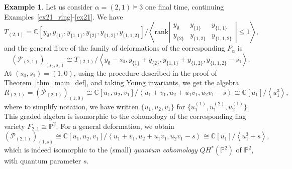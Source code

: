 \documentclass[a4paper,11pt]{amsart}
\theoremstyle{plain}
\theoremstyle{definition}
\newtheorem{example}[theorem]{Example}
\newcommand{\C}{\mathbb{C}}
\newcommand{\CP}{\mathscr{P}}
\renewcommand{\P}{\mathbb{P}}
\begin{document}
\begin{example} Let us consider $\alpha=(2,1)\vDash 3$ one final time, continuing Examples~\ref{ex21_ring}-\ref{ex21}. We have 
\[T_{(2,1)}  = \C[y_\emptyset,y_{\{1\}}, y_{\{1,1\}}, y_{\{2\}}, y_{\{1,2\}}, y_{\{1,1,2\}}]\Big/ \left\langle\mathrm{rank}\left|\begin{array}{ccc} y_\emptyset & y_{\{1\}} & y_{\{1,1\}} \\ y_{\{2\}} & y_{\{1,2\}}& y_{\{1,1,2\}} \end{array}\right|\leq 1\right\rangle,\]
and the general fibre of the family of deformations of the corresponding $P_\alpha$ is
\[ (\CP_{(2,1)})_{(s_0, s_1)} \cong T_{(2,1)} \Big/ \left\langle y_\emptyset-s_0 , y_{\{1\}} + y_{\{2\}}, y_{\{1,1\}} + y_{\{1,2\}}, y_{\{1,1,2\}}-s_1 \right\rangle.
\]
At $(s_0, s_1)=(1,0)$, using the procedure described in the proof of Theorem~\ref{thm_main_def}, and taking
Young invariants, we get the algebra 
\[R_{(2,1)} = (\CP_{(2,1)})_{(1, 0)} \cong \C[u_1, u_2, v_1] / \left\langle u_1 + v_1, u_2+u_1v_1, u_2v_1-s \right\rangle \cong \C[u_1]/\left\langle u_1^3 \right\rangle, \]
where to simplify notation, we have written $\{u_1, u_2, v_1\}$ for $\{u_1^{(1)}, u_1^{(2)}, u_2^{(1)}\}$. This graded algebra is isomorphic to 
the cohomology of the corresponding flag variety $F_{2,1}\cong \P^2$. For a general deformation, we obtain 
\[(\CP_{(2,1)})_{(1, s)} \cong \C[u_1, u_2, v_1] / \left\langle u_1 + v_1, u_2+u_1v_1, u_2v_1-s \right\rangle \cong \C[u_1]/\left\langle u_1^3+s \right\rangle, \]
which is indeed isomorphic to the (small) {\em quantum cohomology} $QH^*(\P^2)$ of $\P^2$, with quantum parameter $s$. 



\end{example}
\end{document}
